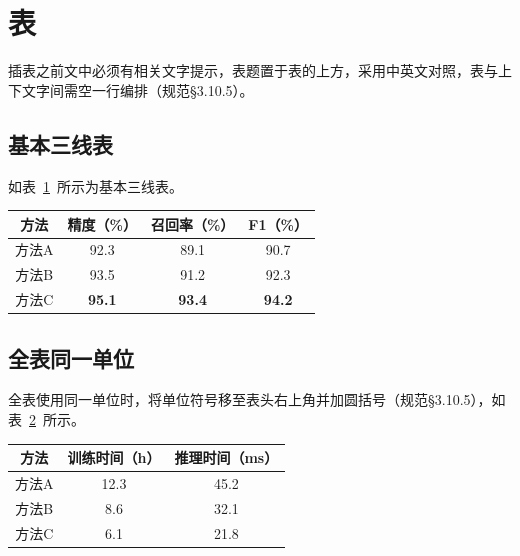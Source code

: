 \section{表}
\label{sec:table}

插表之前文中必须有相关文字提示，表题置于表的上方，采用中英文对照，表与上下文字间需空一行编排（规范§3.10.5）。

\subsection{基本三线表}

如表~\ref{tab:simple}~所示为基本三线表。

\begin{table}[htbp]
    \centering
    \label{tab:simple}
    \begin{tabular}{cccc}
        \toprule
        \textbf{方法} & \textbf{精度（\%）} & \textbf{召回率（\%）} & \textbf{F1（\%）} \\
        \midrule
        方法A & 92.3 & 89.1 & 90.7 \\
        方法B & 93.5 & 91.2 & 92.3 \\
        方法C & \textbf{95.1} & \textbf{93.4} & \textbf{94.2} \\
        \bottomrule
    \end{tabular}
\end{table}

\subsection{全表同一单位}

全表使用同一单位时，将单位符号移至表头右上角并加圆括号（规范§3.10.5），如表~\ref{tab:unit}~所示。

\begin{table}[htbp]
    \centering
    \label{tab:unit}
    \begin{tabular}{ccc}
        \toprule
        \textbf{方法} & \textbf{训练时间（h）} & \textbf{推理时间（ms）} \\
        \midrule
        方法A & 12.3 & 45.2 \\
        方法B & 8.6  & 32.1 \\
        方法C & 6.1  & 21.8 \\
        \bottomrule
    \end{tabular}
\end{table}

